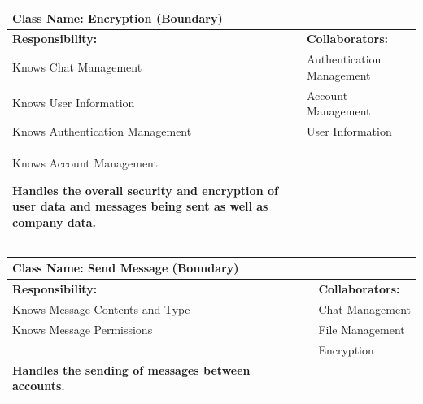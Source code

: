 \documentclass[]{article}
\begin{document}
	\begin{table}[ht]
		\centering
		\begin{tabular}{|p{7cm}|p{7cm}|}
		\hline 
		 \multicolumn{2}{|l|}{\textbf{Class Name:}  Encryption (Boundary)} \\
		\hline
		\textbf{Responsibility:} & \textbf{Collaborators:} \\
		\hline
            Knows Chat Management & Authentication Management\\
            Knows User Information & Account Management\\
            Knows Authentication Management & User Information\\
            Knows Account Management
            
            \vspace{0.1in}
            \textbf{Handles the overall security and encryption of user data and messages being sent as well as company data.}

		\vspace{1in} & \\
		\hline
  
		\end{tabular}
	\end{table}
	\begin{table}[ht]
		\centering
		\begin{tabular}{|p{7cm}|p{7cm}|}
		\hline 
		 \multicolumn{2}{|l|}{\textbf{Class Name:} Send Message (Boundary)} \\
		\hline
		\textbf{Responsibility:} & \textbf{Collaborators:} \\
		\hline
            Knows Message Contents and Type & Chat Management\\
            Knows Message Permissions & File Management\\
            & Encryption\\
            
            \vspace{0.1in}
            \textbf{Handles the sending of messages between accounts.}

		\vspace{1in} & \\
		\hline
  
		\end{tabular}
	\end{table}
\end{document}
